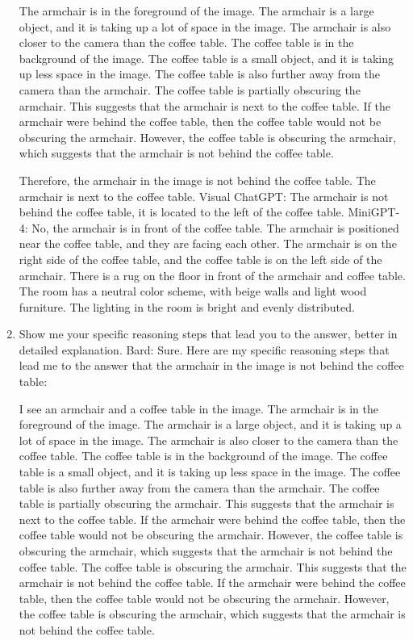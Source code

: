 \begin{enumerate}
    The armchair is in the foreground of the image. The armchair is a large object, and it is taking up a lot of space in the image. The armchair is also closer to the camera than the coffee table.
    The coffee table is in the background of the image. The coffee table is a small object, and it is taking up less space in the image. The coffee table is also further away from the camera than the armchair.
    The coffee table is partially obscuring the armchair. This suggests that the armchair is next to the coffee table.
    If the armchair were behind the coffee table, then the coffee table would not be obscuring the armchair. However, the coffee table is obscuring the armchair, which suggests that the armchair is not behind the coffee table.
    
    Therefore, the armchair in the image is not behind the coffee table. The armchair is next to the coffee table.
    \subitem Visual ChatGPT: The armchair is not behind the coffee table, it is located to the left of the coffee table.
    \subitem MiniGPT-4: No, the armchair is in front of the coffee table. The armchair is positioned near the coffee table, and they are facing each other. The armchair is on the right side of the coffee table, and the coffee table is on the left side of the armchair. There is a rug on the floor in front of the armchair and coffee table. The room has a neutral color scheme, with beige walls and light wood furniture. The lighting in the room is bright and evenly distributed.
    \item Show me your specific reasoning steps that lead you to the answer, better in detailed explanation.
    \subitem Bard: 
    Sure. Here are my specific reasoning steps that lead me to the answer that the armchair in the image is not behind the coffee table:
    
    I see an armchair and a coffee table in the image.
    The armchair is in the foreground of the image. The armchair is a large object, and it is taking up a lot of space in the image. The armchair is also closer to the camera than the coffee table.
    The coffee table is in the background of the image. The coffee table is a small object, and it is taking up less space in the image. The coffee table is also further away from the camera than the armchair.
    The coffee table is partially obscuring the armchair. This suggests that the armchair is next to the coffee table.
    If the armchair were behind the coffee table, then the coffee table would not be obscuring the armchair. However, the coffee table is obscuring the armchair, which suggests that the armchair is not behind the coffee table.
    The coffee table is obscuring the armchair. This suggests that the armchair is not behind the coffee table. If the armchair were behind the coffee table, then the coffee table would not be obscuring the armchair. However, the coffee table is obscuring the armchair, which suggests that the armchair is not behind the coffee table.
    

\end{enumerate}
